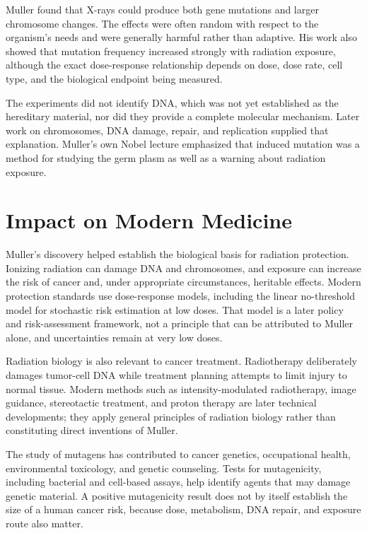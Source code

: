 Muller found that X-rays could produce both gene mutations and larger chromosome changes. The effects were often random with respect to the organism's needs and were generally harmful rather than adaptive. His work also showed that mutation frequency increased strongly with radiation exposure, although the exact dose-response relationship depends on dose, dose rate, cell type, and the biological endpoint being measured.

The experiments did not identify DNA, which was not yet established as the hereditary material, nor did they provide a complete molecular mechanism. Later work on chromosomes, DNA damage, repair, and replication supplied that explanation. Muller's own Nobel lecture emphasized that induced mutation was a method for studying the germ plasm as well as a warning about radiation exposure.

\section{Impact on Modern Medicine}

Muller's discovery helped establish the biological basis for radiation protection. Ionizing radiation can damage DNA and chromosomes, and exposure can increase the risk of cancer and, under appropriate circumstances, heritable effects. Modern protection standards use dose-response models, including the linear no-threshold model for stochastic risk estimation at low doses. That model is a later policy and risk-assessment framework, not a principle that can be attributed to Muller alone, and uncertainties remain at very low doses.

Radiation biology is also relevant to cancer treatment. Radiotherapy deliberately damages tumor-cell DNA while treatment planning attempts to limit injury to normal tissue. Modern methods such as intensity-modulated radiotherapy, image guidance, stereotactic treatment, and proton therapy are later technical developments; they apply general principles of radiation biology rather than constituting direct inventions of Muller.

The study of mutagens has contributed to cancer genetics, occupational health, environmental toxicology, and genetic counseling. Tests for mutagenicity, including bacterial and cell-based assays, help identify agents that may damage genetic material. A positive mutagenicity result does not by itself establish the size of a human cancer risk, because dose, metabolism, DNA repair, and exposure route also matter.

